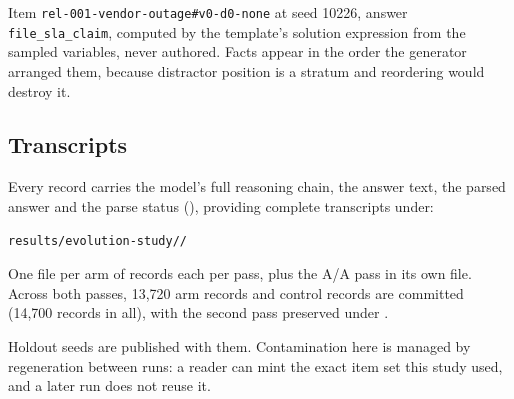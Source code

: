 Item \texttt{rel-001-vendor-outage\#v0-d0-none} at seed 10226, answer
\texttt{file\_sla\_claim}, computed by the template's solution expression
from the sampled variables, never authored. Facts appear in the order the
generator arranged them, because distractor position is a stratum and
reordering would destroy it.

\subsection{Transcripts}

Every record carries the model's full reasoning chain, the answer text, the
parsed answer and the parse status (), providing
complete transcripts under:

\begin{center}
\texttt{results/evolution-study/\NUM{\studyRun}/}
\end{center}

\noindent One file per arm of \NUM{\totalItems} records each per pass, plus
the A/A pass in its own file. Across both passes, 13{,}720 arm records and
\NUM{\aaPairs} control records are committed (14,700 records in all), with
the second pass preserved under .

Holdout seeds are published with them. Contamination here is managed by
regeneration between runs: a reader can mint the exact item set this study
used, and a later run does not reuse it.
